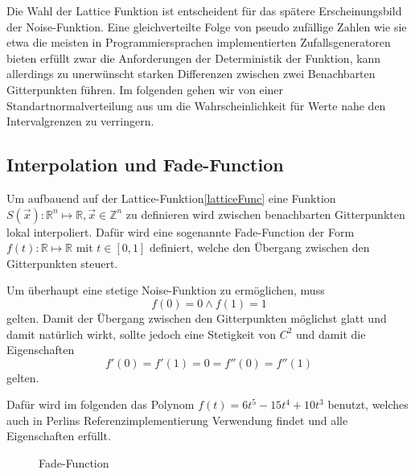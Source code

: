 Die Wahl der Lattice Funktion ist entscheident für das spätere Erscheinungsbild der Noise-Funktion.
Eine gleichverteilte Folge von pseudo zufällige Zahlen wie sie etwa die meisten in Programmiersprachen implementierten Zufallsgeneratoren bieten erfüllt zwar die Anforderungen der Deterministik der Funktion, kann allerdings zu unerwünscht starken Differenzen zwischen zwei Benachbarten Gitterpunkten führen. Im folgenden gehen wir von einer Standartnormalverteilung aus um die Wahrscheinlichkeit für Werte nahe den Intervalgrenzen zu verringern. 

\subsection{Interpolation und Fade-Function}
Um aufbauend auf der Lattice-Funktion\ref{latticeFunc} eine Funktion $S(\vec{x}): \mathbb{R}^n\mapsto\mathbb{R}, \vec{x}\in \mathbb{Z}^n$\label{S} zu definieren wird zwischen benachbarten Gitterpunkten lokal interpoliert. Dafür wird eine sogenannte Fade-Function\cite{fadeFunction} der Form $f(t): \mathbb{R}\mapsto\mathbb{R}$ mit $t\in[0, 1]$ definiert, welche den Übergang zwischen den Gitterpunkten steuert.

Um überhaupt eine stetige Noise-Funktion zu ermöglichen, muss 
\begin{equation}
f(0) = 0 \land f(1) = 1
\end{equation} gelten.
Damit der Übergang zwischen den Gitterpunkten möglichst glatt und damit natürlich wirkt, sollte jedoch eine Stetigkeit von $C^2$ und damit die Eigenschaften 
\begin{equation}
	f'(0) = f'(1) = 0 = f''(0) = f''(1)
\end{equation} 
gelten.

Dafür wird im folgenden das Polynom $f(t) = 6t^5-15t^4+10t^3$ benutzt, welches auch in Perlins Referenzimplementierung Verwendung findet\cite{BurgerGradientNoise2008} und alle Eigenschaften erfüllt.
\begin{figure}[!hbtp]%
	\centering
	\caption{Fade-Function}
\end{figure}

